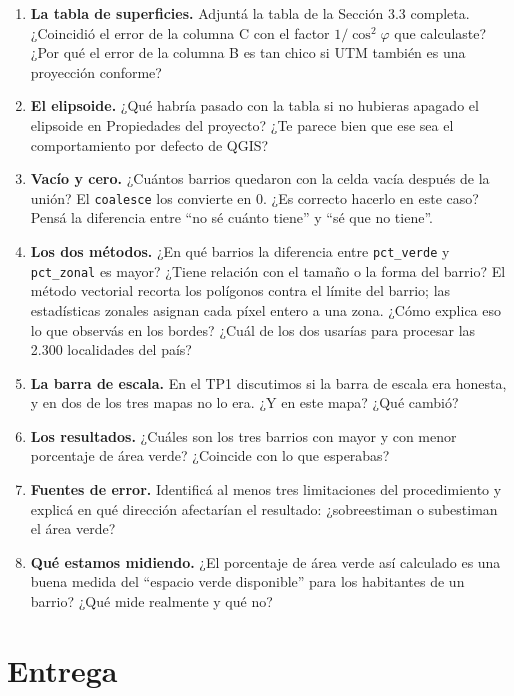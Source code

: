 \documentclass{article}
\begin{document}
\begin{enumerate}
    \item \textbf{La tabla de superficies.} Adjuntá la tabla de la Sección 3.3 completa. ¿Coincidió el error de la columna C con el factor $1/\cos^{2}\varphi$ que calculaste? ¿Por qué el error de la columna B es tan chico si UTM también es una proyección conforme?

    \item \textbf{El elipsoide.} ¿Qué habría pasado con la tabla si no hubieras apagado el elipsoide en Propiedades del proyecto? ¿Te parece bien que ese sea el comportamiento por defecto de QGIS?

    \item \textbf{Vacío y cero.} ¿Cuántos barrios quedaron con la celda vacía después de la unión? El \texttt{coalesce} los convierte en 0. ¿Es correcto hacerlo en este caso? Pensá la diferencia entre ``no sé cuánto tiene'' y ``sé que no tiene''.

    \item \textbf{Los dos métodos.} ¿En qué barrios la diferencia entre \texttt{pct\_verde} y \texttt{pct\_zonal} es mayor? ¿Tiene relación con el tamaño o la forma del barrio? El método vectorial recorta los polígonos contra el límite del barrio; las estadísticas zonales asignan cada píxel entero a una zona. ¿Cómo explica eso lo que observás en los bordes? ¿Cuál de los dos usarías para procesar las 2.300 localidades del país?

    \item \textbf{La barra de escala.} En el TP1 discutimos si la barra de escala era honesta, y en dos de los tres mapas no lo era. ¿Y en este mapa? ¿Qué cambió?

    \item \textbf{Los resultados.} ¿Cuáles son los tres barrios con mayor y con menor porcentaje de área verde? ¿Coincide con lo que esperabas?

    \item \textbf{Fuentes de error.} Identificá al menos tres limitaciones del procedimiento y explicá en qué dirección afectarían el resultado: ¿sobreestiman o subestiman el área verde?

    \item \textbf{Qué estamos midiendo.} ¿El porcentaje de área verde así calculado es una buena medida del ``espacio verde disponible'' para los habitantes de un barrio? ¿Qué mide realmente y qué no?
\end{enumerate}

\section{Entrega}
\end{document}
